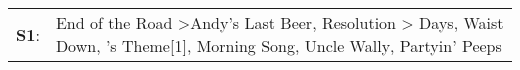 \begin{supertabular}{p{0.03\textwidth}p{0.92\textwidth}}
 \textbf{S1}:  &  End of the Road\textsuperscript{} \textgreater \enspace Andy's Last Beer\textsuperscript{}, \enspace Resolution\textsuperscript{} \textgreater {} Days\textsuperscript{}, \enspace Waist Down\textsuperscript{}, 's Theme[1]\textsuperscript{}, \enspace Morning Song\textsuperscript{}, \enspace Uncle Wally\textsuperscript{}, \enspace Partyin' Peeps\textsuperscript{}  \enspace  \\
\end{supertabular}
